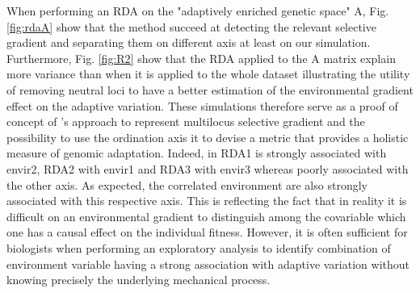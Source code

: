 \documentclass[a4paper,times,10pt,authoryear]{article}%
\begin{document}
When performing an RDA on the "adaptively enriched genetic space" A, Fig. \ref{fig:rdaA} show that the method succeed at detecting the relevant selective gradient and separating them on different axis at least on our simulation. Furthermore, Fig. \ref{fig:R2} show that the RDA applied to the A matrix explain more variance than when it is applied to the whole dataset illustrating the utility of removing neutral loci to have a better estimation of the environmental gradient effect on the adaptive variation. These simulations therefore serve as a proof of concept of \citet{Steane2014a}'s approach to represent multilocus selective gradient and the possibility to use the ordination axis it to devise a metric that provides a holistic measure of genomic adaptation. Indeed, in RDA1 is strongly associated with envir2, RDA2 with envir1 and RDA3 with envir3 whereas poorly associated with the other axis. As expected, the correlated environment are also strongly associated with this respective axis. This is reflecting the fact that in reality it is difficult on an environmental gradient to distinguish  among the covariable which one has a causal effect on the individual fitness. However, it is often sufficient for biologists when performing an exploratory analysis to identify combination of environment variable having a strong association with adaptive variation without knowing precisely the underlying mechanical process.
\end{document}
